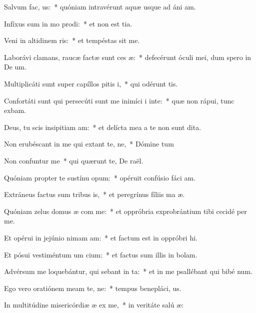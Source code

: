 \item Salvum  fac, us:~* quóniam intravérunt aquæ usque ad áni am.
\item Infíxus sum in mo prodi:~* et non est tia.
\item Veni in altidinem ris:~* et tempéstas sit me.
\item Laborávi clamans, raucæ factæ sunt ces æ:~* defecérunt óculi mei, dum spero in De um.
\item Multiplicáti sunt super capíllos pitis i,~* qui odérunt  tis.
\item Confortáti sunt qui persecúti sunt me inimíci i inte:~* quæ non rápui, tunc exbam.
\item Deus, tu scis insipitiam am:~* et delícta mea a te non sunt dita.
\item Non erubéscant in me qui extant te, ne,~* Dómine tum
\item Non confuntur  me~* qui quærunt te, De raël.
\item Quóniam propter te sustínu opum:~* opéruit confúsio fáci am.
\item Extráneus factus sum tribus is,~* et peregrínus fíliis ma æ.
\item Quóniam zelus domus æ com me:~* et oppróbria exprobrántium tibi cecidé per me.
\item Et opérui in jejúnio nimam am:~* et factum est in oppróbri hi.
\item Et pósui vestiméntum um cium:~* et factus sum illis in bolam.
\item Advérsum me loquebántur, qui sebant in ta:~* et in me psallébant qui bibé num.
\item Ego vero oratiónem meam  te, ne:~* tempus benepláci, us.
\item In multitúdine misericórdiæ æ ex me,~* in veritáte salú æ:
